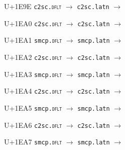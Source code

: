 \documentclass{article}
\begin{document}
\begin{substitutions}
\goodbreak

U+1E9E  \linebreak
    \texttt{c2sc.\textsc{dflt}} $\to$  \linebreak
    \texttt{c2sc.latn} $\to$  

\goodbreak

U+1EA0  \linebreak
    \texttt{c2sc.\textsc{dflt}} $\to$  \linebreak
    \texttt{c2sc.latn} $\to$  

\goodbreak

U+1EA1  \linebreak
    \texttt{smcp.\textsc{dflt}} $\to$  \linebreak
    \texttt{smcp.latn} $\to$  

\goodbreak

U+1EA2  \linebreak
    \texttt{c2sc.\textsc{dflt}} $\to$  \linebreak
    \texttt{c2sc.latn} $\to$  

\goodbreak

U+1EA3  \linebreak
    \texttt{smcp.\textsc{dflt}} $\to$  \linebreak
    \texttt{smcp.latn} $\to$  

\goodbreak

U+1EA4  \linebreak
    \texttt{c2sc.\textsc{dflt}} $\to$  \linebreak
    \texttt{c2sc.latn} $\to$  

\goodbreak

U+1EA5  \linebreak
    \texttt{smcp.\textsc{dflt}} $\to$  \linebreak
    \texttt{smcp.latn} $\to$  

\goodbreak

U+1EA6  \linebreak
    \texttt{c2sc.\textsc{dflt}} $\to$  \linebreak
    \texttt{c2sc.latn} $\to$  

\goodbreak

U+1EA7  \linebreak
    \texttt{smcp.\textsc{dflt}} $\to$  \linebreak
    \texttt{smcp.latn} $\to$  


\end{substitutions}
\end{document}
